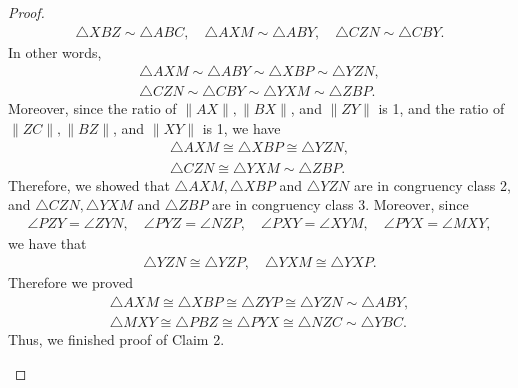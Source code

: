 \begin{proof}
    \begin{align*}
    \triangle{XBZ}\sim\triangle{ABC},
    \quad
    \triangle{AXM}\sim\triangle{ABY},
    \quad
    \triangle{CZN}\sim\triangle{CBY}.
    \end{align*}
    In other words, 
    \begin{align*}
    \triangle{AXM}\sim\triangle{ABY}\sim\triangle{XBP}\sim\triangle{YZN},\\
    \triangle{CZN}\sim\triangle{CBY}\sim\triangle{YXM}\sim\triangle{ZBP}.
    \end{align*}
    Moreover, since the ratio of $\|AX\|, \|BX\|$, and $\|ZY\|$ is 1, and the ratio of $\|ZC\|, \|BZ\|$, and $\|XY\|$ is 1, we have
    \begin{align*}
    \triangle{AXM}\cong\triangle{XBP}\cong\triangle{YZN},\\
    \triangle{CZN}\cong\triangle{YXM}\sim\triangle{ZBP}.
    \end{align*}
    Therefore, we showed that $\triangle{AXM}, \triangle{XBP}$ and $\triangle{YZN}$ are in congruency class 2, and $\triangle{CZN}, \triangle{YXM}$ and $\triangle{ZBP}$ are in congruency class 3.
    Moreover, since 
    \begin{align*}
    \angle{PZY} = \angle{ZYN},
    \quad
    \angle{PYZ} = \angle{NZP},
    \quad
    \angle{PXY} = \angle{XYM},
    \quad
    \angle{PYX} = \angle{MXY},
    \end{align*}
    we have that
    \begin{align*}
    \triangle{YZN}\cong\triangle{YZP},
    \quad
    \triangle{YXM}\cong\triangle{YXP}.
    \end{align*}
    Therefore we proved 
    \begin{align*}
    \triangle{AXM}\cong\triangle{XBP}\cong\triangle{ZYP}\cong\triangle{YZN}\sim\triangle{ABY},\\
    \triangle{MXY}\cong\triangle{PBZ}\cong\triangle{PYX}\cong\triangle{NZC}\sim\triangle{YBC}.
    \end{align*}
    Thus, we finished proof of Claim 2.
    
    \begin{figure}[h!]
    \centering
    \captionsetup{justification=centering}
\end{figure}
\end{proof}
